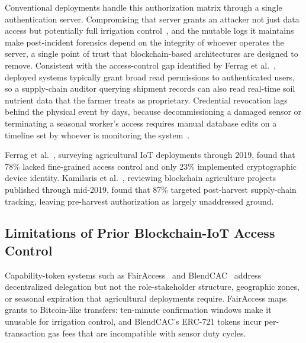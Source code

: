 \documentclass[a4paper,fleqn]{cas-dc}
\begin{document}
Conventional deployments handle this authorization matrix through a
single authentication server. Compromising that server grants an attacker
not just data access but
potentially full irrigation control~\cite{benedict2021decentralized},
and the mutable logs it maintains make post-incident forensics depend
on the integrity of whoever operates the server, a single point of trust
that blockchain-based architectures are designed to remove. Consistent
with the access-control gap identified by Ferrag et
al.~\cite{ferrag2020security}, deployed systems typically grant broad
read permissions to authenticated users, so a supply-chain auditor
querying shipment records can also read real-time soil nutrient data
that the farmer treats as proprietary.
Credential revocation lags behind the physical event by days, because
decommissioning a damaged sensor or terminating a seasonal worker's
access requires manual database edits on a timeline set by whoever is
monitoring the system~\cite{wang2006wireless,ferrag2020security}.

Ferrag et al.~\cite{ferrag2020security}, surveying agricultural IoT
deployments through 2019, found that 78\% lacked fine-grained access
control and only 23\% implemented cryptographic device identity. Kamilaris et al.~\cite{kamilaris2019rise}, reviewing blockchain
agriculture projects published through mid-2019, found that 87\%
targeted post-harvest supply-chain tracking, leaving pre-harvest
authorization as largely unaddressed ground.

\subsection{Limitations of Prior Blockchain-IoT Access Control}
\label{subsec:prior_limits}

Capability-token systems such as FairAccess~\cite{ouaddah2016fairaccess}
and BlendCAC~\cite{xu2018blendcac} address decentralized delegation but
not the role-stakeholder structure, geographic zones, or seasonal
expiration that agricultural deployments require. FairAccess maps grants
to Bitcoin-like transfers: ten-minute confirmation windows make it
unusable for irrigation control, and BlendCAC's ERC-721 tokens incur
per-transaction gas fees that are incompatible with sensor duty cycles.
\end{document}
